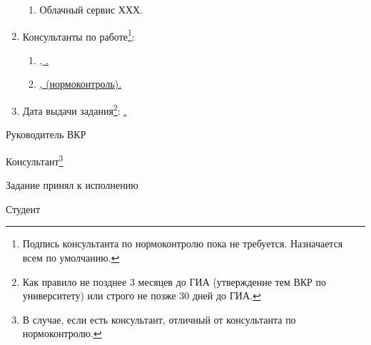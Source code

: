 \begin{enumerate}[1.]
\begin{enumerate}[label=\theenumi\arabic*.]
			\item Облачный сервис ХХХ.%
		\end{enumerate}	
		\item Консультанты по работе\footnote{Подпись консультанта по нормоконтролю пока не требуется. Назначается всем по умолчанию.}:
		\begin{enumerate}[label=\theenumi\arabic*.] 
		\item  \uline{\emakefirstuc{\ConsultantExtraDegree}, \ConsultantExtra.} %
		\item \uline{\emakefirstuc{\ConsultantNormDegree}, \ConsultantNorm{} (нормоконтроль).} %
	\end{enumerate}
		\item Дата выдачи задания\footnote{Как правило не позднее 3 месяцев до ГИА (утверждение тем ВКР по университету) или строго не позже 30 дней до ГИА.}: \uline{\thesisStartDate.}
\end{enumerate}

\intervalS%

Руководитель ВКР \uline{\hspace*{0.1\textheight} \Supervisor}


\intervalS%

Консультант\footnote{В случае, если есть консультант, отличный от консультанта по нормоконтролю.}  \uline{\hspace*{0.1\textheight}\ConsultantExtra}


\intervalS%


Задание принял к исполнению \uline{\thesisStartDate}

\intervalS%

Студент \uline{\hspace*{0.1\textheight}  \Author}



